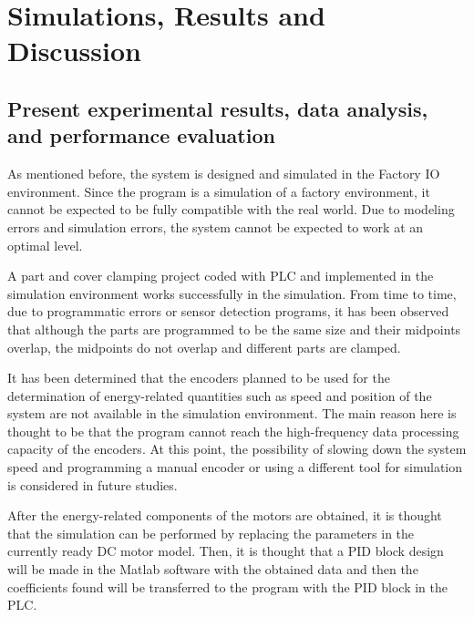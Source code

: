 \doublespacing %

\chapter{Simulations, Results and Discussion}
\label{ch5}

\begin{spacing}{1} %
\minitoc %
\end{spacing} %
\thesisspacing %

\section{Present experimental results, data analysis, and performance evaluation}
As mentioned before, the system is designed and simulated in the Factory IO environment. Since the program is a simulation of a factory environment, it cannot be expected to be fully compatible with the real world. Due to modeling errors and simulation errors, the system cannot be expected to work at an optimal level.

A part and cover clamping project coded with PLC and implemented in the simulation environment works successfully in the simulation. From time to time, due to programmatic errors or sensor detection programs, it has been observed that although the parts are programmed to be the same size and their midpoints overlap, the midpoints do not overlap and different parts are clamped.

It has been determined that the encoders planned to be used for the determination of energy-related quantities such as speed and position of the system are not available in the simulation environment. The main reason here is thought to be that the program cannot reach the high-frequency data processing capacity of the encoders. At this point, the possibility of slowing down the system speed and programming a manual encoder or using a different tool for simulation is considered in future studies.

After the energy-related components of the motors are obtained, it is thought that the simulation can be performed by replacing the parameters in the currently ready DC motor model. Then, it is thought that a PID block design will be made in the Matlab software with the obtained data and then the coefficients found will be transferred to the program with the PID block in the PLC.

